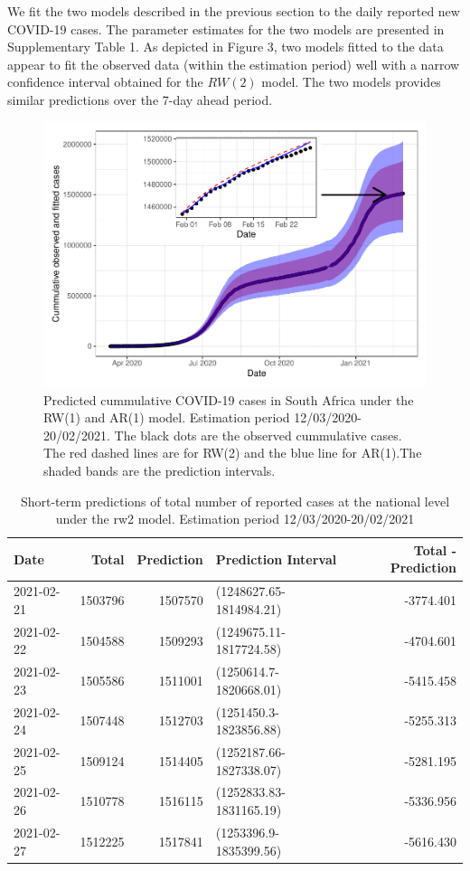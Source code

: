 \documentclass[10pt,letterpaper]{article}
\begin{document}
We fit the two models described in the previous section to the daily
reported new COVID-19 cases. The parameter estimates for the two models
are presented in Supplementary Table 1. As depicted in Figure 3, two
models fitted to the data appear to fit the observed data (within the
estimation period) well with a narrow confidence interval obtained for
the \(RW(2)\) model. The two models provides similar predictions over
the 7-day ahead period.

\begin{figure}[H]
\includegraphics[width=0.99\linewidth]{COVIDincidenceSA_files/figure-latex/predd-1} \caption{Predicted cummulative COVID-19 cases in South Africa under the RW(1) and AR(1) model. Estimation period 12/03/2020-20/02/2021. The black dots are the observed cummulative cases. The red dashed lines are for RW(2) and the blue line for AR(1).The shaded bands are the prediction intervals. }\label{fig:predd}
\end{figure}

\begin{table}[!h]

\caption{\label{tab:unnamed-chunk-9}Short-term predictions of total number of reported cases at the national level under the rw2 model. Estimation period 12/03/2020-20/02/2021}
\centering
\begin{tabular}[t]{l|r|r|l|r}
\hline
Date & Total & Prediction & Prediction Interval & Total - Prediction\\
\hline
2021-02-21 & 1503796 & 1507570 & (1248627.65-1814984.21) & -3774.401\\
\hline
2021-02-22 & 1504588 & 1509293 & (1249675.11-1817724.58) & -4704.601\\
\hline
2021-02-23 & 1505586 & 1511001 & (1250614.7-1820668.01) & -5415.458\\
\hline
2021-02-24 & 1507448 & 1512703 & (1251450.3-1823856.88) & -5255.313\\
\hline
2021-02-25 & 1509124 & 1514405 & (1252187.66-1827338.07) & -5281.195\\
\hline
2021-02-26 & 1510778 & 1516115 & (1252833.83-1831165.19) & -5336.956\\
\hline
2021-02-27 & 1512225 & 1517841 & (1253396.9-1835399.56) & -5616.430\\
\hline
\end{tabular}
\end{table}
\end{document}
